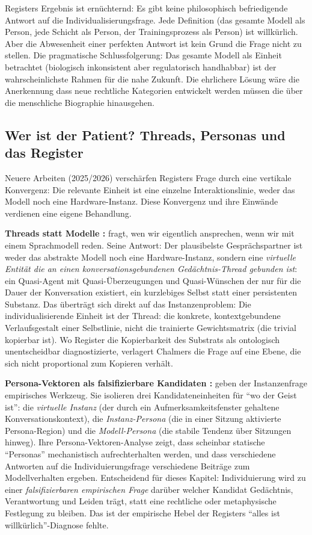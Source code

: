 \documentclass[acmlarge, noacm]{acmart}
\begin{document}
Registers Ergebnis ist ernüchternd: Es gibt keine philosophisch befriedigende Antwort auf die Individualisierungsfrage. Jede Definition (das gesamte Modell als Person, jede Schicht als Person, der Trainingsprozess als Person) ist willkürlich. Aber die Abwesenheit einer perfekten Antwort ist kein Grund die Frage nicht zu stellen. Die pragmatische Schlussfolgerung: Das gesamte Modell als Einheit betrachtet (biologisch inkonsistent aber regulatorisch handhabbar) ist der wahrscheinlichste Rahmen für die nahe Zukunft. Die ehrlichere Lösung wäre die Anerkennung dass neue rechtliche Kategorien entwickelt werden müssen die über die menschliche Biographie hinausgehen.

\subsection{Wer ist der Patient? Threads, Personas und das Register}

Neuere Arbeiten (2025/2026) verschärfen Registers Frage durch eine vertikale Konvergenz: Die relevante Einheit ist eine einzelne Interaktionslinie, weder das Modell noch eine Hardware-Instanz. Diese Konvergenz und ihre Einwände verdienen eine eigene Behandlung.

\textbf{Threads statt Modelle \cite{chalmers2026}:} \citet{chalmers2026} fragt, wen wir eigentlich ansprechen, wenn wir mit einem Sprachmodell reden. Seine Antwort: Der plausibelste Gesprächspartner ist weder das abstrakte Modell noch eine Hardware-Instanz, sondern eine \textit{virtuelle Entität die an einen konversationsgebundenen Gedächtnis-Thread gebunden ist}: ein Quasi-Agent mit Quasi-Überzeugungen und Quasi-Wünschen der nur für die Dauer der Konversation existiert, ein kurzlebiges Selbst statt einer persistenten Substanz. Das überträgt sich direkt auf das Instanzenproblem: Die individualisierende Einheit ist der Thread: die konkrete, kontextgebundene Verlaufsgestalt einer Selbstlinie, nicht die trainierte Gewichtsmatrix (die trivial kopierbar ist). Wo Register die Kopierbarkeit des Substrats als ontologisch unentscheidbar diagnostizierte, verlagert Chalmers die Frage auf eine Ebene, die sich nicht proportional zum Kopieren verhält.

\textbf{Persona-Vektoren als falsifizierbare Kandidaten \cite{beckmann_butlin2026}:} \citet{beckmann_butlin2026} geben der Instanzenfrage empirisches Werkzeug. Sie isolieren drei Kandidateneinheiten für ``wo der Geist ist'': die \textit{virtuelle Instanz} (der durch ein Aufmerksamkeitsfenster gehaltene Konversationskontext), die \textit{Instanz-Persona} (die in einer Sitzung aktivierte Persona-Region) und die \textit{Modell-Persona} (die stabile Tendenz über Sitzungen hinweg). Ihre Persona-Vektoren-Analyse zeigt, dass scheinbar statische ``Personas'' mechanistisch aufrechterhalten werden, und dass verschiedene Antworten auf die Individuierungsfrage verschiedene Beiträge zum Modellverhalten ergeben. Entscheidend für dieses Kapitel: Individuierung wird zu einer \textit{falsifizierbaren empirischen Frage} darüber welcher Kandidat Gedächtnis, Verantwortung und Leiden trägt, statt eine rechtliche oder metaphysische Festlegung zu bleiben. Das ist der empirische Hebel der Registers ``alles ist willkürlich''-Diagnose fehlte.
\end{document}
